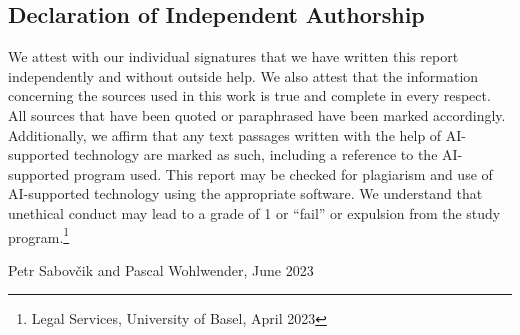 \documentclass{article}
\begin{document}
\subsection{Declaration of Independent Authorship}

We attest with our individual signatures that we have written this report independently and without outside
help. We also attest that the information concerning the sources used in this work is true and complete in every
respect. All sources that have been quoted or paraphrased have been marked accordingly.
Additionally, we affirm that any text passages written with the help of AI-supported technology are marked as
such, including a reference to the AI-supported program used.
This report may be checked for plagiarism and use of AI-supported technology using the appropriate software.
We understand that unethical conduct may lead to a grade of 1 or “fail” or expulsion from the study program.\footnote{Legal Services, University of Basel, April 2023}

\begin{flushright}
Petr Sabovčik and Pascal Wohlwender, June 2023
\end{flushright}
\end{document}
